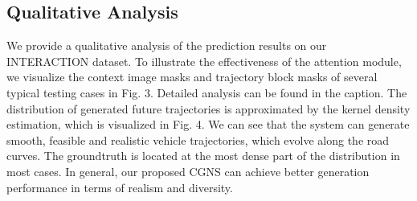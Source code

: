 \documentclass[letterpaper, 10 pt, conference]{ieeeconf}
\begin{document}
\subsection{Qualitative Analysis}

We provide a qualitative analysis of the prediction results on our INTERACTION dataset.
To illustrate the effectiveness of the attention module, we visualize the context image masks and trajectory block masks of several typical testing cases in Fig. 3. Detailed analysis can be found in the caption.
The distribution of generated future trajectories is approximated by the kernel density estimation, which is visualized in Fig. 4. 
We can see that the system can generate smooth, feasible and realistic vehicle trajectories, which evolve along the road curves. 
The groundtruth is located at the most dense part of the distribution in most cases.
In general, our proposed CGNS can achieve better generation performance in terms of realism and diversity. 
\end{document}
